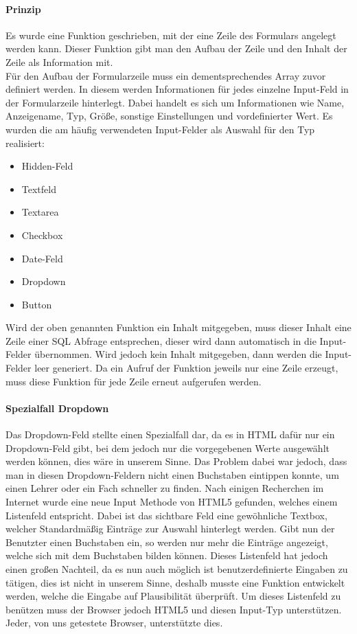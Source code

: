 \paragraph{Prinzip}
Es wurde eine Funktion geschrieben, mit der eine Zeile des Formulars angelegt werden kann. Dieser Funktion gibt man den Aufbau der Zeile und den Inhalt der Zeile als Information mit.\\
Für den Aufbau der Formularzeile muss ein dementsprechendes Array zuvor definiert werden. In diesem werden Informationen für jedes einzelne Input-Feld in der Formularzeile hinterlegt. Dabei handelt es sich um Informationen wie Name, Anzeigename, Typ, Größe, sonstige Einstellungen und vordefinierter Wert. Es wurden die am häufig verwendeten  Input-Felder als Auswahl für den Typ realisiert:
\begin{itemize}
	\item Hidden-Feld
	\item Textfeld
	\item Textarea
	\item Checkbox
	\item Date-Feld
	\item Dropdown
	\item Button
\end{itemize}
Wird der oben genannten Funktion ein Inhalt mitgegeben, muss dieser Inhalt eine Zeile einer SQL Abfrage entsprechen, dieser wird dann automatisch in die Input-Felder übernommen. Wird jedoch kein Inhalt mitgegeben, dann werden die Input-Felder leer generiert. Da ein Aufruf der Funktion jeweils nur eine Zeile erzeugt, muss diese Funktion für jede Zeile erneut aufgerufen werden.
\paragraph{Spezialfall Dropdown}
Das Dropdown-Feld stellte einen Spezialfall dar, da es in HTML dafür nur ein Dropdown-Feld gibt, bei dem jedoch nur die vorgegebenen Werte ausgewählt werden können, dies wäre in unserem Sinne. Das Problem dabei war jedoch, dass man in diesen Dropdown-Feldern nicht einen Buchstaben eintippen konnte, um einen Lehrer oder ein Fach schneller zu finden. Nach einigen Recherchen im Internet wurde eine neue Input Methode von HTML5 gefunden, welches einem Listenfeld entspricht. Dabei ist das sichtbare Feld eine gewöhnliche Textbox, welcher Standardmäßig Einträge zur Auswahl hinterlegt werden. Gibt nun der Benutzter einen Buchstaben ein, so werden nur mehr die Einträge angezeigt, welche sich mit dem Buchstaben bilden können. Dieses Listenfeld hat jedoch einen großen Nachteil, da es nun auch möglich ist benutzerdefinierte Eingaben zu tätigen, dies ist nicht in unserem Sinne, deshalb musste eine Funktion entwickelt werden, welche die Eingabe auf Plausibilität überprüft. Um dieses Listenfeld zu benützen muss der Browser jedoch HTML5 und diesen Input-Typ unterstützen. Jeder, von uns getestete Browser, unterstützte dies.
